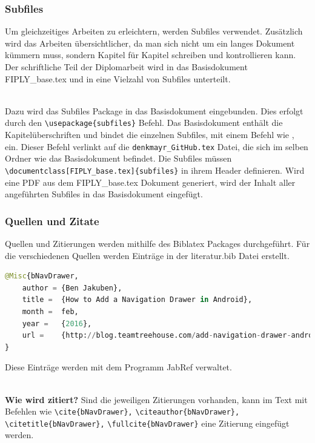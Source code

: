 \documentclass[FIPLY_base.tex]{subfiles}
\begin{document}
\subsubsection{Subfiles}
Um gleichzeitiges Arbeiten zu erleichtern, werden Subfiles verwendet.
Zusätzlich wird das Arbeiten übersichtlicher, da man sich nicht um ein langes Dokument kümmern muss, sondern Kapitel für Kapitel schreiben und kontrollieren kann.
Der schriftliche Teil der Diplomarbeit wird in das Basisdokument FIPLY\_base.tex und in eine Vielzahl von Subfiles unterteilt.

\ \\
Dazu wird das Subfiles Package in das Basisdokument eingebunden.
Dies erfolgt durch den \verb!\usepackage{subfiles}! Befehl.
Das Basisdokument enthält die Kapitelüberschriften und bindet die einzelnen Subfiles, mit einem Befehl wie \verb!!, ein.
Dieser Befehl verlinkt auf die \verb!denkmayr_GitHub.tex! Datei, die sich im selben Ordner wie das Basisdokument befindet.
Die Subfiles müssen \verb!\documentclass[FIPLY_base.tex]{subfiles}! in ihrem Header definieren.
Wird eine PDF aus dem FIPLY\_base.tex Dokument generiert, wird der Inhalt aller angeführten Subfiles in das Basisdokument eingefügt.

\newpage
\subsubsection{Quellen und Zitate}
Quellen und Zitierungen werden mithilfe des Biblatex Packages durchgeführt.
Für die verschiedenen Quellen werden Einträge in der literatur.bib Datei erstellt.

\begin{lstlisting}[language=Python,frame=none]
@Misc{bNavDrawer,
	author = {Ben Jakuben},
	title =  {How to Add a Navigation Drawer in Android},
	month =  feb,
	year =   {2016},
	url =    {http://blog.teamtreehouse.com/add-navigation-drawer-android}
}
\end{lstlisting}
Diese Einträge werden mit dem Programm JabRef verwaltet.

\ \\
\textbf{Wie wird zitiert?} \newline
Sind die jeweiligen Zitierungen vorhanden, kann im Text mit Befehlen wie 
\verb!\cite{bNavDrawer},! \newline 
\verb!\citeauthor{bNavDrawer},! \newline 
\verb!\citetitle{bNavDrawer},! \newline
\verb!\fullcite{bNavDrawer}! \newline
eine Zitierung eingefügt werden. 
\end{document}
